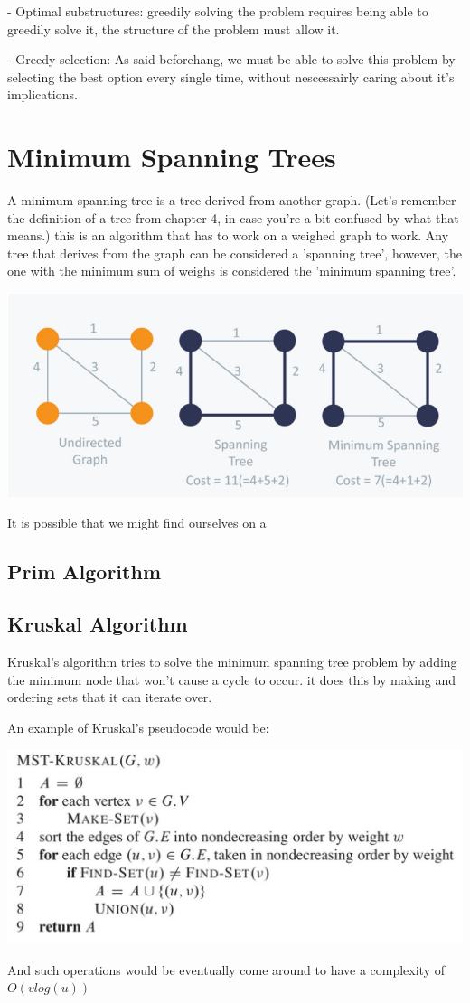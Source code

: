 \documentclass[12pt,a4paper,olive]{bbe}
\begin{document}
	- Optimal substructures: greedily solving the problem requires
	being able to greedily solve it, the structure of the problem must
	allow it.

	- Greedy selection: As said beforehang, we must be able to solve this
	problem by selecting the best option every single time, without nescessairly
	caring about it's implications.

	\section{Minimum Spanning Trees}
	A minimum spanning tree is a tree derived from another graph. (Let's remember the
	definition of a tree from chapter 4, in case you're a bit confused by what that
	means.) this is an algorithm that has to work on a weighed graph to work. Any tree that
	derives from the graph can be considered a 'spanning tree', however, the one with the
	minimum sum of weighs is considered the 'minimum spanning tree'.

	\includegraphics[scale=0.55]{pics/mst.png}

	It is possible that we might find ourselves on a 
	
	\subsection{Prim Algorithm}

	\subsection{Kruskal Algorithm}
	Kruskal's algorithm tries to solve the minimum spanning tree problem by adding
	the minimum node that won't cause a cycle to occur. it does this by making and
	ordering sets that it can iterate over. 

	An example of Kruskal's pseudocode would be:

	\includegraphics[scale=0.4]{pics/kruskal.png} 

	And such operations would be eventually come around to
	have a complexity of $O(v log(u))$
\end{document}
